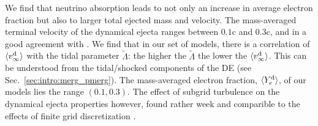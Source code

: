 %
We find that neutrino absorption leads to not only an 
increase in average electron fraction but also to larger total ejected mass 
and velocity. 
The mass-averaged terminal velocity of the dynamical ejecta 
ranges between $0.1$c and $0.3$c, and in a good agreement with 
\cite{Radice:2018pdn}.
%
We find that in our set of models, there is a correlation of $\langle v^{\text{d}}_\infty\rangle$ with the tidal parameter 
$\tilde{\Lambda}$: the higher the $\tilde{\Lambda}$ the lower the $\langle v^{\text{d}}_\infty\rangle$.
This can be understood from the tidal/shocked components of the \ac{DE} 
(see Sec.~\ref{sec:intro:merg_pmerg}).
The mass-averaged electron fraction, $\langle Y^{\text{d}}_{e}\rangle$, of our models lies the range $(0.1, 0.3)$.
The effect of subgrid turbulence on the dynamical ejecta properties however,
found rather week and comparible to the effects of finite grid discretization 
\citep{Bernuzzi:2020txg,Radice:2020ids}.

